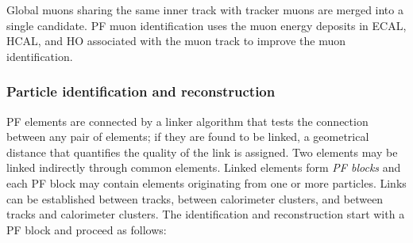 Global muons sharing the same inner track with tracker muons are merged into a single candidate. PF muon identification uses the muon energy deposits in ECAL, HCAL, and HO associated with the muon track to improve the muon identification.

\subsubsection*{Particle identification and reconstruction}

PF elements are connected by a linker algorithm that tests the connection between any pair of elements; if they are found to be linked, a geometrical distance that quantifies the quality of the link is assigned. Two elements may be linked indirectly through common elements. Linked elements form \textit{PF blocks} and each PF block may contain elements originating from one or more particles. Links can be established between tracks, between calorimeter clusters, and between tracks and calorimeter clusters. The identification and reconstruction start with a PF block and proceed as follows:     

